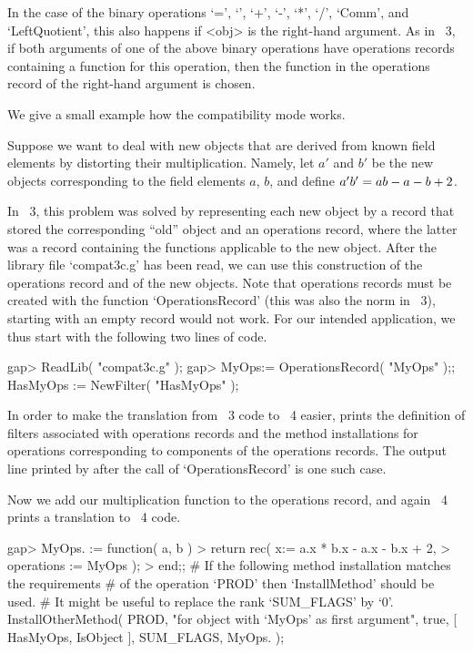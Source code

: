 In the case of the binary operations `=', `\<', `+', `-', `*', `/',
`Comm', and `LeftQuotient',
this also happens if <obj> is the right-hand argument.
As in {\GAP}~3, if both arguments of one of the above binary operations
have operations records containing a function for this operation,
then the function in the operations record of the right-hand argument
is chosen.

We give a small example how the compatibility mode works.

Suppose we want to deal with new objects that are derived from known
field elements by distorting their multiplication.  Namely, let $a'$
and $b'$ be the new objects corresponding to the field elements $a$,
$b$, and define $a' \* b' = a b - a - b + 2$.

In {\GAP}~3, this problem was solved by representing each new object
by a record that stored the corresponding ``old'' object and an
operations record, where the latter was a record containing the
functions applicable to the new object.  After the library file
`compat3c.g' has been read, we can use this construction of the
operations record and of the new objects.  Note that operations
records must be created with the function `OperationsRecord' (this was
also the norm in {\GAP}~3), starting with an empty record would not work.
For our intended application, we thus start with the following two
lines of code.

\begintt
gap> ReadLib( "compat3c.g" );
gap> MyOps:= OperationsRecord( "MyOps" );; 
HasMyOps := NewFilter( "HasMyOps" );
\endtt

In order to make the translation from {\GAP}~3 code to {\GAP}~4
easier, {\GAP} prints the definition of filters associated with
operations records and the method installations for operations
corresponding to components of the operations records.  The output
line printed by {\GAP} after the call of `OperationsRecord' is one
such case.

Now we add our multiplication function to the operations record,
and again {\GAP}~4 prints a translation to {\GAP}~4 code.

\begintt
gap> MyOps.\* := function( a, b )
>        return rec( x:= a.x * b.x - a.x - b.x + 2,
>                    operations := MyOps );
>    end;;
# If the following method installation matches the requirements
# of the operation `PROD' then `InstallMethod' should be used.
# It might be useful to replace the rank `SUM_FLAGS' by `0'.
InstallOtherMethod( PROD,
    "for object with `MyOps' as first argument",
    true,
    [ HasMyOps, IsObject ], SUM_FLAGS,
    MyOps.\* );

